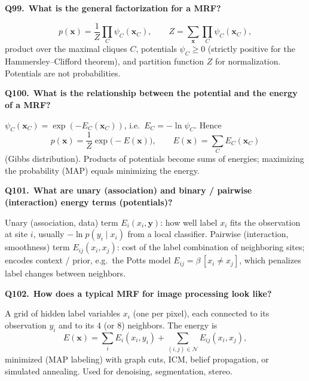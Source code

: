 \documentclass[11pt,a4paper]{article}
\newcommand{\keep}[1]{\par
  \ifdim\dimexpr\pagegoal-\pagetotal\relax<#1\relax\newpage\fi}
\newcommand{\q}[2]{\keep{2.5cm}\medskip
  {\sffamily\bfseries\color{questc}Q#1.}\ {\sffamily\bfseries #2}\par}
\begin{document}
\q{99}{What is the general factorization for a MRF?}
\[
  p(\mathbf{x}) = \frac{1}{Z}\prod_{C}\psi_C(\mathbf{x}_C), \qquad
  Z = \sum_{\mathbf{x}}\prod_C \psi_C(\mathbf{x}_C),
\]
\noindent
product over the maximal cliques $C$, potentials $\psi_C\ge0$ (strictly
positive for the Hammersley--Clifford theorem), and partition function $Z$ for
normalization. Potentials are not probabilities.

\q{100}{What is the relationship between the potential and the energy of a
MRF?}
$\psi_C(\mathbf{x}_C) = \exp(-E_C(\mathbf{x}_C))$, i.e.\ $E_C = -\ln\psi_C$.
Hence
\[
  p(\mathbf{x}) = \frac1Z\exp\big(-E(\mathbf{x})\big), \qquad
  E(\mathbf{x}) = \sum_C E_C(\mathbf{x}_C)
\]
\noindent
(Gibbs distribution). Products of potentials become sums of energies;
maximizing the probability (MAP) equals minimizing the energy.

\q{101}{What are unary (association) and binary / pairwise (interaction) energy
terms (potentials)?}
Unary (association, data) term $E_i(x_i, \mathbf{y})$: how well label $x_i$
fits the observation at site $i$, usually $-\ln p(y_i\mid x_i)$ from a local
classifier. Pairwise (interaction, smoothness) term $E_{ij}(x_i,x_j)$: cost of
the label combination of neighboring sites; encodes context / prior, e.g.\ the
Potts model $E_{ij} = \beta\,[x_i\neq x_j]$, which penalizes label changes
between neighbors.

\q{102}{How does a typical MRF for image processing look like?}
\begin{center}
\end{center}
\noindent
A grid of hidden label variables $x_i$ (one per pixel), each connected to its
observation $y_i$ and to its 4 (or 8) neighbors. The energy is
\[
  E(\mathbf{x}) = \sum_i E_i(x_i, y_i) + \sum_{(i,j)\in\mathcal N} E_{ij}(x_i,x_j),
\]
\noindent
minimized (MAP labeling) with graph cuts, ICM, belief propagation, or
simulated annealing. Used for denoising, segmentation, stereo.
\end{document}
